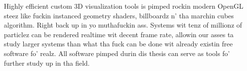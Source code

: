 Highly efficient custom 3D visualization tools is pimped rockin modern OpenGL steez like fuckin instanced geometry shaders, billboardz n' tha marchin cubes algorithm. Right back up in yo muthafuckin ass. Systems wit tenz of millionz of particlez can be rendered realtime wit decent frame rate, allowin our asses ta study larger systems than what tha fuck can be done wit already existin free software fo' realz. All software pimped durin dis thesis can serve as tools fo' further study up in tha field.